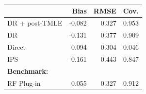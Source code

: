 \begin{tabular}{l*{3}{r}} 
\toprule 
 &  Bias &  RMSE &  Cov. \\ 
 \midrule
DR + post-TMLE & -0.082 & 0.327 & 0.953\\
DR & -0.131 & 0.377 & 0.909 \\
Direct & 0.094 & 0.304 & 0.046 \\
IPS  & -0.161 & 0.443 & 0.847 \\ 
\midrule
\multicolumn{4}{l}{\textbf{Benchmark:}} \\
RF Plug-in & 0.055 & 0.327 & 0.912 \\
\bottomrule 
\end{tabular}